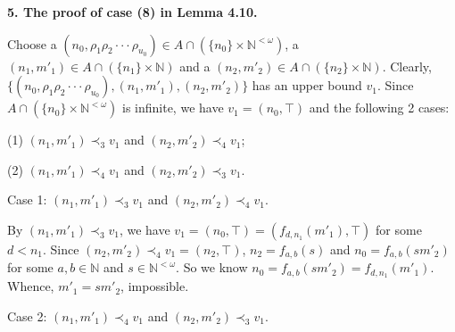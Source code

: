 \documentclass[preprint,12pt]{elsarticle}
\numberwithin{equation}{section}
\newcommand{\dn}{\mathord{\downarrow}\hspace{0.05em}}
\begin{document}



{\bf 5. The proof of case (8) in Lemma 4.10.}

Choose a $(n_{0},\rho_{1}\rho_{2}\cdot\cdot\cdot\rho_{u_{0}})\in A\cap(\{n_{0}\}\times\mathbb{N}^{<\omega})$, a $(n_{1},m'_{1})\in A\cap(\{n_{1}\}\times\mathbb{N})$ and a $(n_{2},m'_{2})\in A\cap(\{n_{2}\}\times\mathbb{N})$.
Clearly, $\{(n_{0},\rho_{1}\rho_{2}\cdot\cdot\cdot\rho_{u_{0}}),(n_{1},m'_{1}),(n_{2},m'_{2})\}$
has an upper bound $v_{1}$.
Since $A\cap (\{n_{0}\}\times \mathbb{N}^{<\omega})$ is infinite, we have $v_{1}=(n_{0},\top)$ and the following 2 cases:

(1) $(n_{1},m'_{1})\prec_{3}v_{1}$ and $(n_{2},m'_{2})\prec_{4}v_{1}$;

(2) $(n_{1},m'_{1})\prec_{4}v_{1}$ and $(n_{2},m'_{2})\prec_{3}v_{1}$.

 Case 1: $(n_{1},m'_{1})\prec_{3}v_{1}$ and $(n_{2},m'_{2})\prec_{4}v_{1}$.

 By $(n_{1},m'_{1})\prec_{3}v_{1}$, we have $v_{1}=(n_{0},\top)=(f_{d,n_{1}}(m'_{1}),\top)$ for some $d<n_{1}$. Since $(n_{2},m'_{2})\prec_{4}v_{1}=(n_{2},\top)$, $n_{2}=f_{a,b}(s)$ and $n_{0}=f_{a,b}(sm'_{2})$ for some $a,b\in\mathbb{N}$ and $s\in\mathbb{N}^{<\omega}$. So we know $n_{0}=f_{a,b}(sm'_{2})=f_{d,n_{1}}(m'_{1})$. Whence, $m'_{1}=sm'_{2}$, impossible.

Case 2: $(n_{1},m'_{1})\prec_{4}v_{1}$ and $(n_{2},m'_{2})\prec_{3}v_{1}$.
\end{document}
